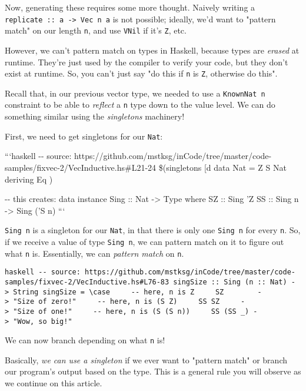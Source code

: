 \documentclass[]{article}
\begin{document}
Now, generating these requires some more thought. Naively writing a
\texttt{replicate\ ::\ a\ -\textgreater{}\ Vec\ n\ a} is not possible; ideally,
we'd want to "pattern match" on our length \texttt{n}, and use \texttt{VNil} if
it's \texttt{\textquotesingle{}Z}, etc.

However, we can't pattern match on types in Haskell, because types are
\emph{erased} at runtime. They're just used by the compiler to verify your code,
but they don't exist at runtime. So, you can't just say "do this if \texttt{n}
is \texttt{\textquotesingle{}Z}, otherwise do this".

Recall that, in our previous vector type, we needed to use a
\texttt{KnownNat\ n} constraint to be able to \emph{reflect} a \texttt{n} type
down to the value level. We can do something similar using the \emph{singletons}
machinery!

First, we need to get singletons for our \texttt{Nat}:

```haskell -\/- source:
https://github.com/mstksg/inCode/tree/master/code-samples/fixvec-2/VecInductive.hs\#L21-24
\$(singletons {[}d\textbar{} data Nat = Z \textbar{} S Nat deriving Eq
\textbar{}{]})

-\/- this creates: data instance Sing :: Nat -\textgreater{} Type where SZ ::
Sing 'Z SS :: Sing n -\textgreater{} Sing ('S n) ```

\texttt{Sing\ n} is a singleton for our \texttt{Nat}, in that there is only one
\texttt{Sing\ n} for every \texttt{n}. So, if we receive a value of type
\texttt{Sing\ n}, we can pattern match on it to figure out what \texttt{n} is.
Essentially, we can \emph{pattern match} on \texttt{n}.

\texttt{haskell\ -\/-\ source:\ https://github.com/mstksg/inCode/tree/master/code-samples/fixvec-2/VecInductive.hs\#L76-83\ singSize\ ::\ Sing\ (n\ ::\ Nat)\ -\textgreater{}\ String\ singSize\ =\ \textbackslash{}case\ \ \ \ \ -\/-\ here,\ n\ is\ \textquotesingle{}Z\ \ \ \ \ SZ\ \ \ \ \ \ \ \ -\textgreater{}\ "Size\ of\ zero!"\ \ \ \ \ -\/-\ here,\ n\ is\ (\textquotesingle{}S\ \textquotesingle{}Z)\ \ \ \ \ SS\ SZ\ \ \ \ \ -\textgreater{}\ "Size\ of\ one!"\ \ \ \ \ -\/-\ here,\ n\ is\ (\textquotesingle{}S\ (\textquotesingle{}S\ n))\ \ \ \ \ SS\ (SS\ \_)\ -\textgreater{}\ "Wow,\ so\ big!"}

We can now branch depending on what \texttt{n} is!

Basically, \emph{we can use a singleton} if we ever want to "pattern match" or
branch our program's output based on the type. This is a general rule you will
observe as we continue on this article.
\end{document}
